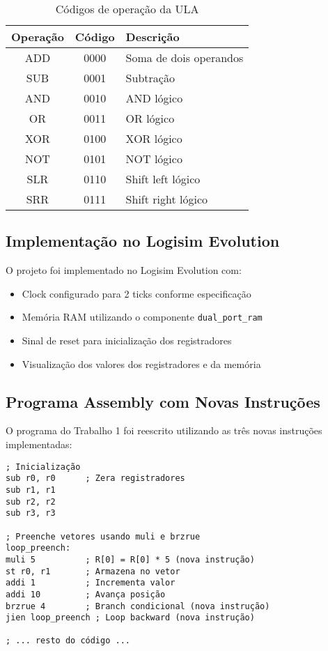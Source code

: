 \begin{table}[h]
\centering
\caption{Códigos de operação da ULA}
\begin{tabular}{|c|c|l|}
\hline
\textbf{Operação} & \textbf{Código} & \textbf{Descrição} \\
\hline
ADD & 0000 & Soma de dois operandos \\
SUB & 0001 & Subtração \\
AND & 0010 & AND lógico \\
OR & 0011 & OR lógico \\
XOR & 0100 & XOR lógico \\
NOT & 0101 & NOT lógico \\
SLR & 0110 & Shift left lógico \\
SRR & 0111 & Shift right lógico \\
\hline
\end{tabular}
\label{tab:ula_ops}
\end{table}

\subsection{Implementação no Logisim Evolution}
O projeto foi implementado no Logisim Evolution com:
\begin{itemize}
    \item Clock configurado para 2 ticks conforme especificação
    \item Memória RAM utilizando o componente \texttt{dual\_port\_ram}
    \item Sinal de reset para inicialização dos registradores
    \item Visualização dos valores dos registradores e da memória
\end{itemize}

\subsection{Programa Assembly com Novas Instruções}
O programa do Trabalho 1 foi reescrito utilizando as três novas instruções implementadas:

\begin{lstlisting}[language={[x86masm]Assembler},caption=Programa com novas instruções]
; Inicialização
sub r0, r0      ; Zera registradores
sub r1, r1
sub r2, r2
sub r3, r3

; Preenche vetores usando muli e brzrue
loop_preench:
muli 5          ; R[0] = R[0] * 5 (nova instrução)
st r0, r1       ; Armazena no vetor
addi 1          ; Incrementa valor
addi 10         ; Avança posição
brzrue 4        ; Branch condicional (nova instrução)
jien loop_preench ; Loop backward (nova instrução)

; ... resto do código ...
\end{lstlisting}

